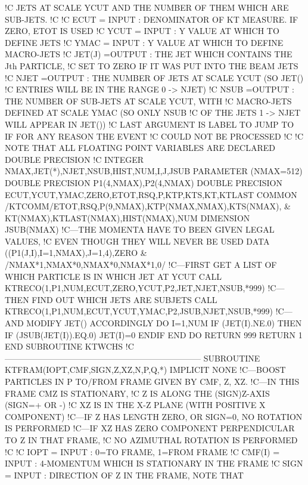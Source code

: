 !C   JETS AT SCALE YCUT AND THE NUMBER OF THEM WHICH ARE SUB-JETS.
!C
!C   ECUT     = INPUT : DENOMINATOR OF KT MEASURE. IF ZERO, ETOT IS USED
!C   YCUT     = INPUT : Y VALUE AT WHICH TO DEFINE JETS
!C   YMAC     = INPUT : Y VALUE AT WHICH TO DEFINE MACRO-JETS
!C   JET(J)   =OUTPUT : THE JET WHICH CONTAINS THE Jth PARTICLE,
!C                        SET TO ZERO IF IT WAS PUT INTO THE BEAM JETS
!C   NJET     =OUTPUT : THE NUMBER OF JETS AT SCALE YCUT (SO JET()
!C                        ENTRIES WILL BE IN THE RANGE 0 -> NJET)
!C   NSUB     =OUTPUT : THE NUMBER OF SUB-JETS AT SCALE YCUT, WITH
!C                        MACRO-JETS DEFINED AT SCALE YMAC (SO ONLY NSUB
!C                        OF THE JETS 1 -> NJET WILL APPEAR IN JET())
!C   LAST ARGUMENT IS LABEL TO JUMP TO IF FOR ANY REASON THE EVENT
!C   COULD NOT BE PROCESSED
!C
!C   NOTE THAT ALL FLOATING POINT VARIABLES ARE DECLARED DOUBLE PRECISION
!C
      INTEGER NMAX,JET(*),NJET,NSUB,HIST,NUM,I,J,JSUB
      PARAMETER (NMAX=512)
      DOUBLE PRECISION P1(4,NMAX),P2(4,NMAX)
      DOUBLE PRECISION ECUT,YCUT,YMAC,ZERO,ETOT,RSQ,P,KTP,KTS,KT,KTLAST
      COMMON /KTCOMM/ETOT,RSQ,P(9,NMAX),KTP(NMAX,NMAX),KTS(NMAX), &
           KT(NMAX),KTLAST(NMAX),HIST(NMAX),NUM
      DIMENSION JSUB(NMAX)
!C---THE MOMENTA HAVE TO BEEN GIVEN LEGAL VALUES,
!C   EVEN THOUGH THEY WILL NEVER BE USED
      DATA ((P1(J,I),I=1,NMAX),J=1,4),ZERO &
           /NMAX*1,NMAX*0,NMAX*0,NMAX*1,0/
!C---FIRST GET A LIST OF WHICH PARTICLE IS IN WHICH JET AT YCUT
      CALL KTRECO(1,P1,NUM,ECUT,ZERO,YCUT,P2,JET,NJET,NSUB,*999)
!C---THEN FIND OUT WHICH JETS ARE SUBJETS
      CALL KTRECO(1,P1,NUM,ECUT,YCUT,YMAC,P2,JSUB,NJET,NSUB,*999)
!C---AND MODIFY JET() ACCORDINGLY
      DO I=1,NUM
         IF (JET(I).NE.0) THEN
            IF (JSUB(JET(I)).EQ.0) JET(I)=0
         ENDIF
      END DO
      RETURN
999   RETURN 1
    END SUBROUTINE KTWCHS
!C-----------------------------------------------------------------------
    SUBROUTINE KTFRAM(IOPT,CMF,SIGN,Z,XZ,N,P,Q,*)
      IMPLICIT NONE
!C---BOOST PARTICLES IN P TO/FROM FRAME GIVEN BY CMF, Z, XZ.
!C---IN THIS FRAME CMZ IS STATIONARY,
!C                   Z IS ALONG THE (SIGN)Z-AXIS (SIGN=+ OR -)
!C                  XZ IS IN THE X-Z PLANE (WITH POSITIVE X COMPONENT)
!C---IF Z HAS LENGTH ZERO, OR SIGN=0, NO ROTATION IS PERFORMED
!C---IF XZ HAS ZERO COMPONENT PERPENDICULAR TO Z IN THAT FRAME,
!C   NO AZIMUTHAL ROTATION IS PERFORMED
!C
!C   IOPT    = INPUT  : 0=TO FRAME, 1=FROM FRAME
!C   CMF(I)  = INPUT  : 4-MOMENTUM WHICH IS STATIONARY IN THE FRAME
!C   SIGN    = INPUT  : DIRECTION OF Z IN THE FRAME, NOTE THAT
